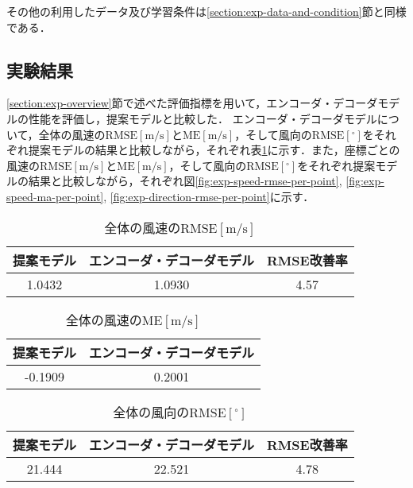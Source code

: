 その他の利用したデータ及び学習条件は\ref{section:exp-data-and-condition}節と同様である．

\subsection{実験結果 \label{subsection:exp-results-without-physicial-structure}}
\ref{section:exp-overview}節で述べた評価指標を用いて，エンコーダ・デコーダモデルの性能を評価し，提案モデルと比較した．
エンコーダ・デコーダモデルについて，全体の風速の$\mathrm{RMSE[m/s]}$と$\mathrm{ME[m/s]}$，そして風向の$\mathrm{RMSE[^\circ]}$をそれぞれ提案モデルの結果と比較しながら，それぞれ表\ref{table:exp-total-rmse}に示す．また，座標ごとの風速の$\mathrm{RMSE[m/s]}$と$\mathrm{ME[m/s]}$，そして風向の$\mathrm{RMSE[^\circ]}$をそれぞれ提案モデルの結果と比較しながら，それぞれ図\ref{fig:exp-speed-rmse-per-point}, \ref{fig:exp-speed-ma-per-point}, \ref{fig:exp-direction-rmse-per-point}に示す．

\begin{table}[bp]
  \caption{全体の風速の$\mathrm{RMSE[m/s]}$}
  \label{table:exp-total-rmse}
  \centering
  \begin{tabular}{ccc}
    \hline
    提案モデル & エンコーダ・デコーダモデル & RMSE改善率 \\
    \hline
    1.0432 & 1.0930 & 4.57 \\
    \hline
  \end{tabular}
\end{table}

\begin{table}[bp]
  \caption{全体の風速の$\mathrm{ME[m/s]}$}
  \label{table:exp-total-me}
  \centering
  \begin{tabular}{cc}
    \hline
    提案モデル & エンコーダ・デコーダモデル \\
    \hline
    -0.1909 & 0.2001 \\
    \hline
  \end{tabular}
\end{table}

\begin{table}[bp]
  \caption{全体の風向の$\mathrm{RMSE[^\circ]}$}
  \label{table:exp-total-direction-rmse}
  \centering
  \begin{tabular}{ccc}
    \hline
    提案モデル & エンコーダ・デコーダモデル & RMSE改善率 \\
    \hline
    21.444 & 22.521 & 4.78 \\
    \hline
  \end{tabular}
\end{table}


